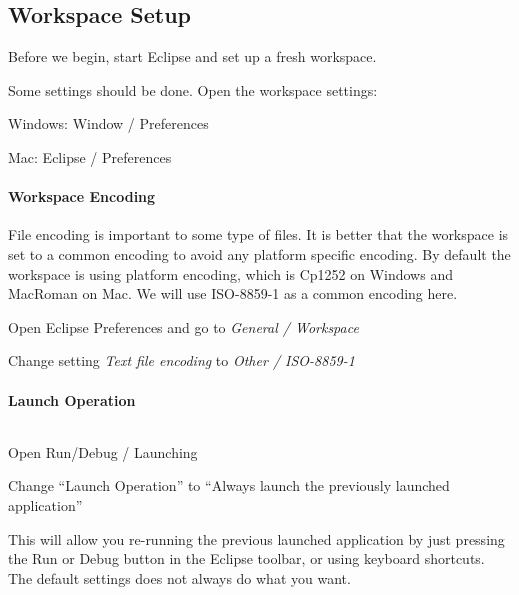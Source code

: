 \subsection{Workspace Setup}

Before we begin, start Eclipse and set up a fresh workspace.

Some settings should be done. Open the workspace settings:

\begin{compactitem}
    \item Windows: Window / Preferences
    \item Mac: Eclipse / Preferences
\end{compactitem}

\paragraph{Workspace Encoding}
$\;$ \\
File encoding is important to some type of files. It is better that the
workspace is set to a common encoding to avoid any platform specific encoding.
By default the workspace is using platform encoding, which is Cp1252 on Windows
and MacRoman on Mac. We will use ISO-8859-1 as a common encoding here.

\begin{compactitem}
    \item Open Eclipse Preferences and go to \emph{General / Workspace}
    \item Change setting \emph{Text file encoding} to \emph{Other /
    ISO-8859-1}
\end{compactitem}

\paragraph{Launch Operation}
$\;$ \\

\begin{compactitem}
    \item Open Run/Debug / Launching
    \item Change ``Launch Operation'' to ``Always
    launch the previously launched application''
\end{compactitem}
This will allow you re-running the previous launched application by just
pressing the Run or Debug button in the Eclipse toolbar, or using keyboard
shortcuts. The default settings does not always do what you want.

